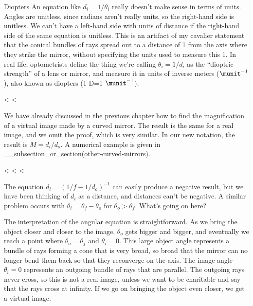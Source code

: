 \begin{eg}{Diopters}
An equation like $d_i=1/\theta_i$ really doesn't make sense
in terms of units. Angles are unitless, since radians aren't
really units, so the right-hand side is unitless. We can't
have a left-hand side with units of distance if the
right-hand side of the same equation is unitless. This is an
artifact of my cavalier statement that the conical bundles
of rays spread out to a distance of 1 from the axis where
they strike the mirror, without specifying the units used to
measure this 1. In real life, optometrists define the thing
we're calling $\theta_i=1/d_i$ as the ``dioptric strength''
of a lens or mirror, and measure it in units of inverse
meters ($\munit^{-1}$), also known as diopters (1 D=1 $\munit^{-1}$).
\end{eg}

<%
<%

We have already discussed in the previous chapter how to
find the magnification of a virtual image made by a curved
mirror. The result is the same for a real image, and we omit
the proof, which is very similar. In our new notation, the
result is $M=d_i/d_o$. A numerical example is given in
__subsection_or_section(other-curved-mirrors).

\vspace{0mm plus 1mm}

<%
<%
<%

The equation $d_i=(1/f-1/d_o)^{-1}$ can easily produce a negative result,
but we have been thinking of $d_i$ as a distance, and
distances can't be negative. A similar problem occurs with
$\theta_i=\theta_f-\theta_o$ for $\theta_o>\theta_f$.
What's going on here?

The interpretation of the angular equation is straightforward.
As we bring the object closer and closer to the image,
$\theta_o$ gets bigger and bigger, and eventually we reach a
point where $\theta_o=\theta_f$ and $\theta_i=0$. This large
object angle represents a bundle of rays forming a cone that
is very broad, so broad that the mirror can no longer bend
them back so that they reconverge on the axis. The image
angle $\theta_i=0$ represents an outgoing bundle of rays
that are parallel. The outgoing rays never cross, so this is
not a real image, unless we want to be charitable and say
that the rays cross at infinity. If we go on bringing the
object even closer, we get a virtual image.

